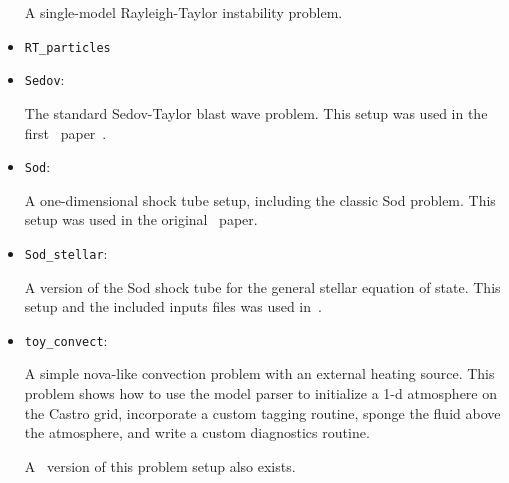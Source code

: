 \begin{itemize}
  A single-model Rayleigh-Taylor instability problem.
  
  
\item {\tt RT\_particles}

\item {\tt Sedov}:

  The standard Sedov-Taylor blast wave problem.  This setup was used
  in the first \castro\ paper~\cite{castro_I}.
    
\item {\tt Sod}:
  
  A one-dimensional shock tube setup, including the classic Sod
  problem.  This setup was used in the original \castro\ paper.
  
\item {\tt Sod\_stellar}:

  A version of the Sod shock tube for the general stellar equation of
  state.  This setup and the included inputs files was used
  in~\cite{zingalekatz}.

  
\item {\tt toy\_convect}:

  A simple nova-like convection problem with an external heating
  source.  This problem shows how to use the model parser to
  initialize a 1-d atmosphere on the Castro grid, incorporate a custom
  tagging routine, sponge the fluid above the atmosphere, and write a
  custom diagnostics routine.

  A \maestro\ version of this problem setup also exists.
  
\end{itemize}
